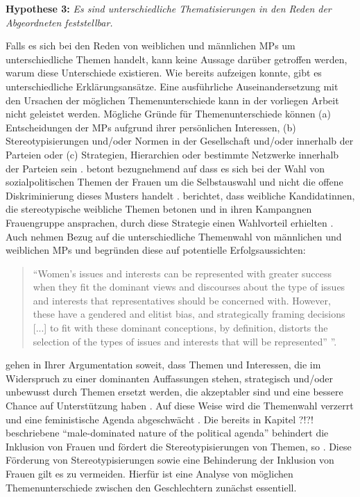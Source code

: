 \documentclass[12pt, 
    twoside=false, 
    bibliography=totoc, 
    numbers=endperiod, 
    headings=normal, 
    toc=chapterentrydotfill
    ]{scrbook}
\begin{document}
\textbf{Hypothese 3:} \emph{Es sind unterschiedliche Thematisierungen in den Reden der Abgeordneten feststellbar.}


Falls es sich bei den Reden von weiblichen und männlichen MPs um unterschiedliche Themen handelt, kann keine Aussage darüber getroffen werden, warum diese Unterschiede existieren.
Wie \textcite{back_2014} bereits aufzeigen konnte, gibt es unterschiedliche Erklärungsansätze. Eine ausführliche Auseinandersetzung mit den Ursachen der möglichen Themenunterschiede kann in der vorliegen Arbeit nicht geleistet werden. Mögliche Gründe für Themenunterschiede können (a) Entscheidungen der MPs aufgrund ihrer persönlichen Interessen, (b) Stereotypisierungen und/oder Normen in der Gesellschaft und/oder innerhalb der Parteien oder (c) Strategien, Hierarchien oder bestimmte Netzwerke innerhalb der Parteien sein \parencites[507]{back_2014}.\textcite [250]{ennser-jedenastik_2017} betont bezugnehmend auf \textcites{backgaard_2012}{thomas_1994} dass es sich bei der Wahl von sozialpolitischen Themen der Frauen um die Selbstauswahl und nicht die offene Diskriminierung dieses Musters handelt \parencite[250]{ennser-jedenastik_2017}. \textcite{herrnson_2003} berichtet, dass weibliche Kandidatinnen, die stereotypische weibliche Themen betonen und in ihren Kampangnen Frauengruppe ansprachen, durch diese Strategie einen Wahlvorteil erhielten \parencite[250]{ennser-jedenastik_2017}. Auch \textcite{celis_2018} nehmen Bezug auf die unterschiedliche Themenwahl von männlichen und weiblichen MPs und begründen diese auf potentielle Erfolgsaussichten:

\begin{quote}
    \enquote{Women’s issues and interests can be represented with greater success when they fit the dominant views and discourses about the type of issues and interests that representatives should be concerned with. However, these have a gendered and elitist bias, and strategically framing decisions [...] to fit with these dominant conceptions, by definition, distorts the selection of the types of issues and interests that will be represented” \parencite[151]{celis_2018}}.
\end{quote}

\textcite{celis_2018} gehen in Ihrer Argumentation soweit, dass Themen und Interessen, die im Widerspruch zu einer dominanten Auffassungen stehen, strategisch und/oder unbewusst durch Themen ersetzt werden, die akzeptabler sind und eine bessere Chance auf Unterstützung haben \parencites[151]{celis_2018}{swers_2002}. 
Auf diese Weise wird die Themenwahl verzerrt und eine feministische Agenda abgeschwächt \parencite[151]{celis_2018}. Die bereits in Kapitel ?!?! beschriebene “male-dominated nature of the political agenda” \parencite[151]{celis_2018} behindert die Inklusion von Frauen und fördert die Stereotypisierungen von Themen, so \textcite{celis_2018}.
Diese Förderung von Stereotypisierungen sowie eine Behinderung der Inklusion von Frauen gilt es zu vermeiden. Hierfür ist eine Analyse von möglichen Themenunterschiede zwischen den Geschlechtern zunächst essentiell. 
\end{document}
